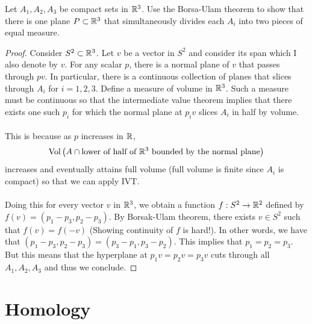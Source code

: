 \documentclass[a4paper]{article}
\begin{document}
\begin{ex}{}{} Let $A_1,A_2,A_3$ be compact sets in $\mathbb{R}^3$. Use the Borsa-Ulam theorem to show that there is one plane $P\subset\mathbb{R}^3$ that simultaneously divides each $A_i$ into two pieces of equal measure. \tcbline
\begin{proof}
Consider $S^2\subset\mathbb{R}^3$. Let $v$ be a vector in $S^2$ and consider its span which I also denote by $v$. For any scalar $p$, there is a normal plane of $v$ that passes through $pv$. In particular, there is a continuous collection of planes that slices through $A_i$ for $i=1,2,3$. Define a measure of volume in $\mathbb{R}^3$. Such a measure must be continuous so that the intermediate value theorem implies that there exists one such $p_i$ for which the normal plane at $p_iv$ slices $A_i$ in half by volume. \\~\\

This is because as $p$ increases in $\mathbb{R}$, $$\text{Vol}\left(A\cap\text{lower of half of }\mathbb{R}^3\text{ bounded by the normal plane}\right)$$ increases and eventually attains full volume (full volume is finite since $A_i$ is compact) so that we can apply IVT. \\~\\

Doing this for every vector $v$ in $\mathbb{R}^3$, we obtain a function $f:S^2\to\mathbb{R}^2$ defined by $f(v)=(p_1-p_3,p_2-p_3)$. By Borsak-Ulam theorem, there exists $v\in S^2$ such that $f(v)=f(-v)$ (Showing continuity of $f$ is hard!). In other words, we have that $(p_1-p_3,p_2-p_3)=(p_3-p_1,p_3-p_2)$. This implies that $p_1=p_2=p_3$. But this means that the hyperplane at $p_1v=p_2v=p_3v$ cuts through all $A_1,A_2,A_3$ and thus we conclude. 
\end{proof}
\end{ex}

\pagebreak

\section{Homology}
\end{document}

